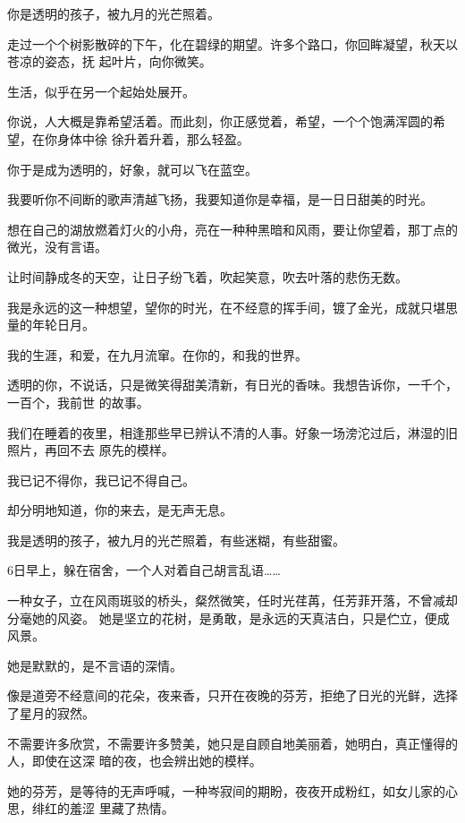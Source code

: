 \documentclass[12pt,a4paper]{article}
\begin{document}
	\endwriting



		你是透明的孩子，被九月的光芒照着。

		走过一个个树影散碎的下午，化在碧绿的期望。许多个路口，你回眸凝望，秋天以苍凉的姿态，抚
	起叶片，向你微笑。

		生活，似乎在另一个起始处展开。

		你说，人大概是靠希望活着。而此刻，你正感觉着，希望，一个个饱满浑圆的希望，在你身体中徐
	徐升着升着，那么轻盈。

		你于是成为透明的，好象，就可以飞在蓝空。

		我要听你不间断的歌声清越飞扬，我要知道你是幸福，是一日日甜美的时光。

		想在自己的湖放燃着灯火的小舟，亮在一种种黑暗和风雨，要让你望着，那丁点的微光，没有言语。

		让时间静成冬的天空，让日子纷飞着，吹起笑意，吹去叶落的悲伤无数。

		我是永远的这一种想望，望你的时光，在不经意的挥手间，镀了金光，成就只堪思量的年轮日月。

		我的生涯，和爱，在九月流窜。在你的，和我的世界。

		透明的你，不说话，只是微笑得甜美清新，有日光的香味。我想告诉你，一千个，一百个，我前世
	的故事。

		我们在睡着的夜里，相逢那些早已辨认不清的人事。好象一场滂沱过后，淋湿的旧照片，再回不去
	原先的模样。

		我已记不得你，我已记不得自己。\par
		却分明地知道，你的来去，是无声无息。\par
		我是透明的孩子，被九月的光芒照着，有些迷糊，有些甜蜜。\par
		6日早上，躲在宿舍，一个人对着自己胡言乱语……

	\endwriting



		一种女子，立在风雨斑驳的桥头，粲然微笑，任时光荏苒，任芳菲开落，不曾减却分毫她的风姿。
	她是坚立的花树，是勇敢，是永远的天真洁白，只是伫立，便成风景。


		她是默默的，是不言语的深情。

		像是道旁不经意间的花朵，夜来香，只开在夜晚的芬芳，拒绝了日光的光鲜，选择了星月的寂然。

		不需要许多欣赏，不需要许多赞美，她只是自顾自地美丽着，她明白，真正懂得的人，即使在这深
	暗的夜，也会辨出她的模样。

		她的芬芳，是等待的无声呼喊，一种岑寂间的期盼，夜夜开成粉红，如女儿家的心思，绯红的羞涩
	里藏了热情。
\end{document}
